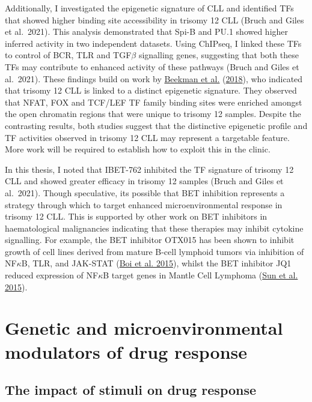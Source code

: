 \documentclass[11pt, a4paper, twosided]{book}
\begin{document}
Additionally, I investigated the epigenetic signature of CLL and identified TFs that showed higher binding site accessibility in trisomy 12 CLL (Bruch and Giles et al.~2021). This analysis demonstrated that Spi-B and PU.1 showed higher inferred activity in two independent datasets. Using ChIPseq, I linked these TFs to control of BCR, TLR and TGF\(\beta\) signalling genes, suggesting that both these TFs may contribute to enhanced activity of these pathways (Bruch and Giles et al.~2021). These findings build on work by \protect\hyperlink{ref-Beekman2018}{Beekman et al.} (\protect\hyperlink{ref-Beekman2018}{2018}), who indicated that trisomy 12 CLL is linked to a distinct epigenetic signature. They observed that NFAT, FOX and TCF/LEF TF family binding sites were enriched amongst the open chromatin regions that were unique to trisomy 12 samples. Despite the contrasting results, both studies suggest that the distinctive epigenetic profile and TF activities observed in trisomy 12 CLL may represent a targetable feature. More work will be required to establish how to exploit this in the clinic.

In this thesis, I noted that IBET-762 inhibited the TF signature of trisomy 12 CLL and showed greater efficacy in trisomy 12 samples (Bruch and Giles et al.~2021). Though speculative, its possible that BET inhibition represents a strategy through which to target enhanced microenvironmental response in trisomy 12 CLL. This is supported by other work on BET inhibitors in haematological malignancies indicating that these therapies may inhibit cytokine signalling. For example, the BET inhibitor OTX015 has been shown to inhibit growth of cell lines derived from mature B-cell lymphoid tumors via inhibition of NF\(\kappa\)B, TLR, and JAK-STAT (\protect\hyperlink{ref-Boi2015}{Boi et al. 2015}), whilst the BET inhibitor JQ1 reduced expression of NF\(\kappa\)B target genes in Mantle Cell Lymphoma (\protect\hyperlink{ref-Sun2015}{Sun et al. 2015}).

\hypertarget{genetic-and-microenvironmental-modulators-of-drug-response}{%
\section{Genetic and microenvironmental modulators of drug response}\label{genetic-and-microenvironmental-modulators-of-drug-response}}

\hypertarget{the-impact-of-stimuli-on-drug-response}{%
\subsection{The impact of stimuli on drug response}\label{the-impact-of-stimuli-on-drug-response}}
\end{document}
